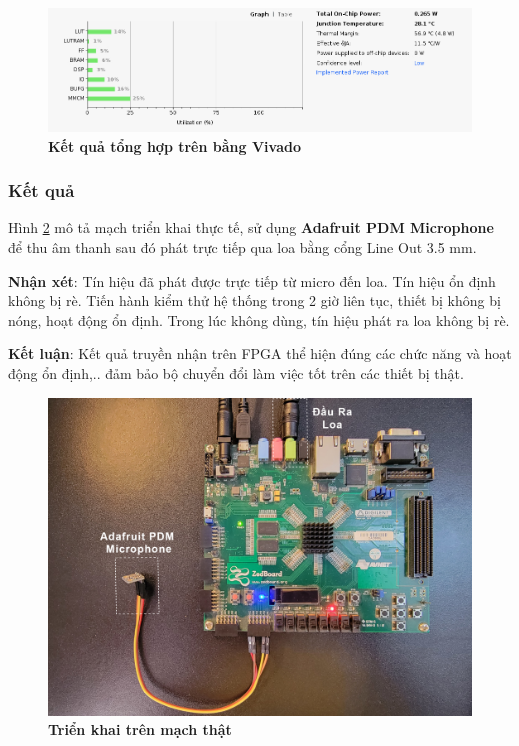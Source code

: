 \begin{figure}[H]
    \centering
    \includegraphics[width=14cm]{Images/Chuong5/fpga/syn_fpga.png}
    \caption[Kết quả tổng hợp trên bằng Vivado]{\bfseries \fontsize{12pt}{0pt}\selectfont Kết quả tổng hợp trên bằng Vivado}
    \label{syn_fpga}
\end{figure}

\subsubsection{Kết quả}

Hình \ref{machthat_2} mô tả mạch triển khai thực tế, sử dụng \textbf{Adafruit PDM Microphone} để thu âm thanh sau đó phát trực tiếp qua loa bằng cổng Line Out 3.5 mm.

\textbf{Nhận xét}: Tín hiệu đã phát được trực tiếp từ micro đến loa. Tín hiệu ổn định không bị rè. Tiến hành kiểm thử hệ thống trong 2 giờ liên tục, thiết bị không bị nóng, hoạt động ổn định. Trong lúc không dùng, tín hiệu phát ra loa không bị rè.

\textbf{Kết luận}: Kết quả truyền nhận trên FPGA thể hiện đúng các chức năng và hoạt động ổn định,.. đảm bảo bộ chuyển đổi làm việc tốt trên các thiết bị thật.


\begin{figure}[H]
    \centering
    \includegraphics[width=14cm]{Images/Chuong5/fpga/machthat_2.png}
    \caption[Triển khai trên mạch thật]{\bfseries \fontsize{12pt}{0pt}\selectfont Triển khai trên mạch thật}
    \label{machthat_2}
\end{figure}

